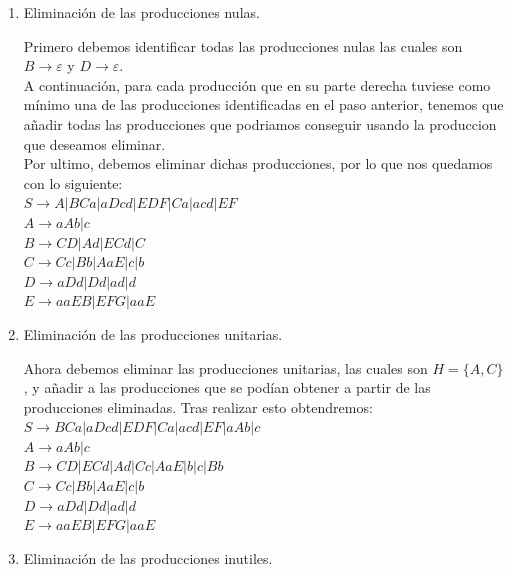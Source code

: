 \documentclass[10pt,a4paper,spanish]{report}
\begin{document}
\begin{enumerate}
	\item Eliminación de las producciones nulas.

	      \noindent
	      Primero debemos identificar todas las producciones nulas las cuales son $B \rightarrow \varepsilon$ y $D \rightarrow \varepsilon$. \\

	      \noindent
	      A continuación, para cada producción que en su parte derecha tuviese como mínimo una de las producciones identificadas en el paso anterior, tenemos que añadir todas las producciones que podriamos conseguir usando la produccion que deseamos eliminar. \\

	      \noindent
	      Por ultimo, debemos eliminar dichas producciones, por lo que nos quedamos con lo siguiente: \\

	      $S \rightarrow A | BCa | aDcd | EDF | Ca | acd | EF$ \\
	      $A \rightarrow aAb | c$ \\
	      $B \rightarrow CD | Ad | ECd | C$ \\
	      $C \rightarrow Cc | Bb | AaE | c | b$ \\
	      $D \rightarrow aDd | Dd | ad | d$ \\
	      $E \rightarrow aaEB | EFG | aaE $

	      \newpage
	\item Eliminación de las producciones unitarias.

	      \noindent
	      Ahora debemos eliminar las producciones unitarias, las cuales son $H = \{A, C\}$, y añadir a las producciones que se podían obtener a partir de las producciones eliminadas. Tras realizar esto obtendremos: \\

	      $S \rightarrow BCa | aDcd | EDF | Ca | acd | EF | aAb | c$ \\
	      $A \rightarrow aAb | c$ \\
	      $B \rightarrow CD | ECd | Ad | Cc | AaE | b | c | Bb$ \\
	      $C \rightarrow Cc | Bb | AaE | c | b$ \\
	      $D \rightarrow aDd | Dd | ad | d$ \\
	      $E \rightarrow aaEB | EFG | aaE $

	\item Eliminación de las producciones inutiles.


\end{enumerate}
\end{document}
